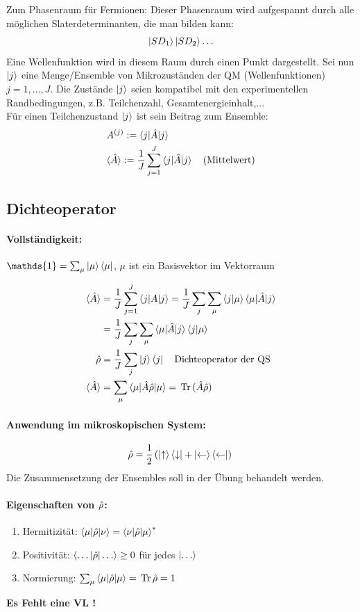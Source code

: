 Zum Phasenraum für Fermionen:
Dieser Phasenraum wird aufgespannt durch alle möglichen Slaterdeterminanten, die man
bilden kann: 
\[{}
    \ket{SD_{1}} \ket{SD_{2}} \dots{}
\]
Eine Wellenfunktion wird in diesem Raum durch einen Punkt dargestellt.
Sei nun $\ket{j}$ eine Menge/Ensemble von Mikrozuständen der QM (Wellenfunktionen)
$j = 1,\dots, J$. Die Zustände $\ket{j}$ seien kompatibel mit den experimentellen 
Randbedingungen, z.B. Teilchenzahl, Gesamtenergieinhalt,...\\
Für einen Teilchenzustand $\ket{j}$ ist sein Beitrag zum Ensemble:
\begin{align*}
    &A^{(j)} := \braket{j | \hat{A} | j}\\
    &\langle \hat{A} \rangle := \frac{1}{J} \sum_{j=1}^{J} \braket{j| \hat{A} | j} \quad 
    \text{(Mittelwert)}
\end{align*}

    \subsection{Dichteoperator}

\paragraph{Vollständigkeit:} $\mathds{1} = \sum_{\mu} \ket{\mu} \bra{\mu}$, $\mu$ 
ist ein Basisvektor im Vektorraum

\begin{align*}
    \langle \hat{A} \rangle&= \frac{1}{J} \sum_{j=1}^{J} \braket{j | A | j} = \frac{1}{J} 
               \sum_{j} \sum_{\mu} \braket{j|\mu}\braket{\mu|\hat{A}|j}\\
    \quad   &= \frac{1}{J} \sum_{j} \sum_{\mu} \braket{\mu|\hat{A}|j}\braket{j|\mu}\\
    \hat{\rho}    &= \frac{1}{J} \sum_{j} \ket{j}\bra{j} \quad 
              \text{Dichteoperator der QS}\\
    \langle \hat{A} \rangle&= \sum_{\mu} \braket{\mu| \hat{A} \hat{\rho} |\mu} = \, \text{Tr} \, (\hat{A} \hat{\rho})
\end{align*}

\paragraph{Anwendung im mikroskopischen System:}
\[{}
    \hat{\rho} = \frac12 \left( \ket{\uparrow} \bra{\downarrow} + \ket{\leftarrow} 
                           \bra{\leftarrow} \right){}
\]
{}
Die Zusammensetzung der Ensembles soll in der Übung behandelt werden.

\paragraph{Eigenschaften von $\hat{\rho}$:}
\begin{enumerate}
    \item Hermitizität: $\braket{\mu|\hat{\rho}|\nu} = \braket{\nu|\hat{\rho}|\mu}^{*}$\\
    \item Positivität: $\braket{\dots|\hat{\rho}|\dots} \geq 0$ für jedes 
          $\ket{\dots}$\\
    \item Normierung: $\sum_{\mu} \braket{\mu|\hat{\rho}|\mu} = \, \text{Tr} \, \hat{\rho} = 1$
\end{enumerate}

\textbf{Es Fehlt eine VL ! }
